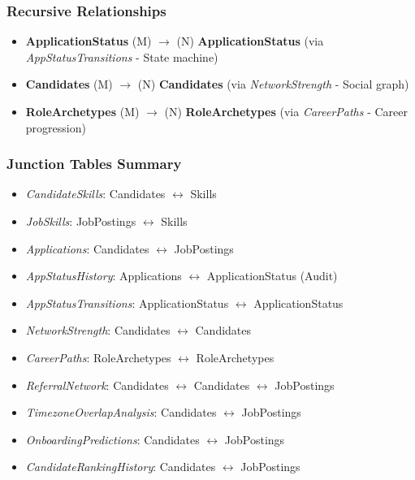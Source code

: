 \documentclass[11pt,a4paper]{article}
\begin{document}
\subsubsection*{Recursive Relationships}
\begin{itemize}
    \item \textbf{ApplicationStatus} (M) $\rightarrow$ (N) \textbf{ApplicationStatus} (via \textit{AppStatusTransitions} - State machine)
    \item \textbf{Candidates} (M) $\rightarrow$ (N) \textbf{Candidates} (via \textit{NetworkStrength} - Social graph)
    \item \textbf{RoleArchetypes} (M) $\rightarrow$ (N) \textbf{RoleArchetypes} (via \textit{CareerPaths} - Career progression)
\end{itemize}

\subsubsection*{Junction Tables Summary}
\begin{itemize}
    \item \textit{CandidateSkills}: Candidates $\leftrightarrow$ Skills
    \item \textit{JobSkills}: JobPostings $\leftrightarrow$ Skills
    \item \textit{Applications}: Candidates $\leftrightarrow$ JobPostings
    \item \textit{AppStatusHistory}: Applications $\leftrightarrow$ ApplicationStatus (Audit)
    \item \textit{AppStatusTransitions}: ApplicationStatus $\leftrightarrow$ ApplicationStatus
    \item \textit{NetworkStrength}: Candidates $\leftrightarrow$ Candidates
    \item \textit{CareerPaths}: RoleArchetypes $\leftrightarrow$ RoleArchetypes
    \item \textit{ReferralNetwork}: Candidates $\leftrightarrow$ Candidates $\leftrightarrow$ JobPostings
    \item \textit{TimezoneOverlapAnalysis}: Candidates $\leftrightarrow$ JobPostings
    \item \textit{OnboardingPredictions}: Candidates $\leftrightarrow$ JobPostings
    \item \textit{CandidateRankingHistory}: Candidates $\leftrightarrow$ JobPostings
\end{itemize}

\end{document}

